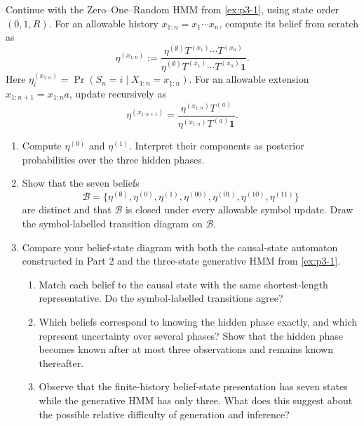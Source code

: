 \documentclass[11pt]{article}
\begin{document}
\begin{exercise}
\label{ex:p3-2}
  Continue with the Zero--One--Random HMM from \cref{ex:p3-1}, using state order
  $(0,1,R)$. For an allowable history $x_{1:n}=x_1\cdots x_n$, compute its
  belief from scratch as
  \[
    \eta^{(x_{1:n})}
      :=\frac{\eta^{(\emptyset)}T^{(x_1)}\cdots T^{(x_n)}}
        {\eta^{(\emptyset)}T^{(x_1)}\cdots T^{(x_n)}\mathbf 1}.
  \]
  Here $\eta_i^{(x_{1:n})}=\Pr(S_n=i\mid X_{1:n}=x_{1:n})$. For an allowable
  extension $x_{1:n+1}=x_{1:n}a$, update recursively as
  \[
    \eta^{(x_{1:n+1})}
      =\frac{\eta^{(x_{1:n})}T^{(a)}}
        {\eta^{(x_{1:n})}T^{(a)}\mathbf 1}.
  \]

  \begin{enumerate}
    \item Compute $\eta^{(0)}$ and $\eta^{(1)}$. Interpret their components
      as posterior probabilities over the three hidden phases.

    \item Show that the seven beliefs
      \[
        \mathcal B=
        \bigl\{
          \eta^{(\emptyset)},\eta^{(0)},\eta^{(1)},\eta^{(00)},
          \eta^{(01)},\eta^{(10)},\eta^{(11)}
        \bigr\}
      \]
      are distinct and that $\mathcal B$ is closed under every allowable
      symbol update. Draw the symbol-labelled transition diagram on
      $\mathcal B$.

    \item Compare your belief-state diagram with both the causal-state
      automaton constructed in Part 2 and the three-state generative HMM from
      \cref{ex:p3-1}.
      \begin{enumerate}
        \item Match each belief to the causal state with the same
          shortest-length representative. Do the symbol-labelled transitions
          agree?

        \item Which beliefs correspond to knowing the hidden phase exactly,
          and which represent uncertainty over several phases? Show that the
          hidden phase becomes known after at most three observations and
          remains known thereafter.

        \item Observe that the finite-history belief-state presentation has
          seven states while the generative HMM has only three. What does this
          suggest about the possible relative difficulty of generation and
          inference?
      \end{enumerate}


\end{enumerate}
\end{exercise}
\end{document}

